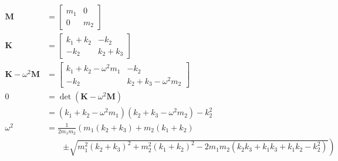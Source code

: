 \documentclass{article}
\renewcommand{\vec}[1]{\boldsymbol{\mathbf{#1}}}
\begin{document}
\begin{align*}
  \vec{M}                    & = \begin{bmatrix}
                                   m_1 & 0   \\
                                   0   & m_2
                                 \end{bmatrix}                                                                                                             \\
  \vec{K}                    & = \begin{bmatrix}
                                   k_1 + k_2 & -k_2      \\
                                   -k_2      & k_2 + k_3
                                 \end{bmatrix}                                                                                                      \\
  \vec{K} - \omega^2 \vec{M} & = \begin{bmatrix}
                                   k_1 + k_2 - \omega^2 m_1 & -k_2                     \\
                                   -k_2                     & k_2 + k_3 - \omega^2 m_2
                                 \end{bmatrix}                                                                        \\
  0                          & = \det (\vec{K} - \omega^2 \vec{M})                                                                                          \\
                             & = (k_1 + k_2 - \omega^2 m_1) (k_2 + k_3 - \omega^2 m_2) - k_2^2                                                              \\
  \omega^2                   & = \frac{1}{2 m_1 m_2} \left( m_1 (k_2 + k_3) + m_2 (k_1 + k_2) \right.                                                       \\
                             & \qquad \left. \pm \sqrt{m_1^2 (k_2 + k_3)^2 + m_2^2 (k_1 + k_2)^2 - 2 m_1 m_2 (k_2 k_3 + k_1 k_3 + k_1 k_2 - k_2^2)} \right) \\
\end{align*}

\setcounter{subsection}{4}
\subsection{}
\end{document}
